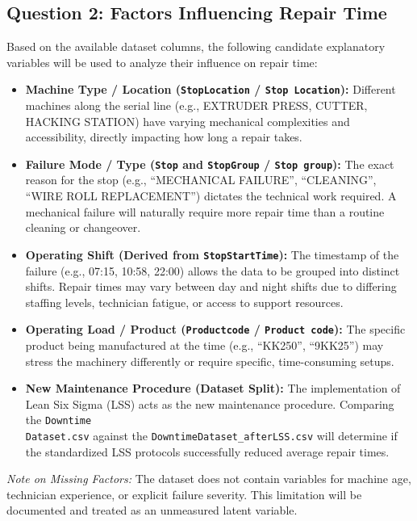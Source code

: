\subsection*{Question 2: Factors Influencing Repair Time}
Based on the available dataset columns, the following candidate explanatory variables will be used to analyze their influence on repair time:
\begin{itemize}
    \item \textbf{Machine Type / Location (\texttt{StopLocation} / \texttt{Stop Location}):} Different machines along the serial line (e.g., EXTRUDER PRESS, CUTTER, HACKING STATION) have varying mechanical complexities and accessibility, directly impacting how long a repair takes.
    \item \textbf{Failure Mode / Type (\texttt{Stop} and \texttt{StopGroup} / \texttt{Stop group}):} The exact reason for the stop (e.g., ``MECHANICAL FAILURE'', ``CLEANING'', ``WIRE ROLL REPLACEMENT'') dictates the technical work required. A mechanical failure will naturally require more repair time than a routine cleaning or changeover.
    \item \textbf{Operating Shift (Derived from \texttt{StopStartTime}):} The timestamp of the failure (e.g., 07:15, 10:58, 22:00) allows the data to be grouped into distinct shifts. Repair times may vary between day and night shifts due to differing staffing levels, technician fatigue, or access to support resources.
    \item \textbf{Operating Load / Product (\texttt{Productcode} / \texttt{Product code}):} The specific product being manufactured at the time (e.g., ``KK250'', ``9KK25'') may stress the machinery differently or require specific, time-consuming setups.
    \item \textbf{New Maintenance Procedure (Dataset Split):} The implementation of Lean Six Sigma (LSS) acts as the new maintenance procedure. Comparing the \texttt{Downtime\\Dataset.csv} against the \texttt{DowntimeDataset\_afterLSS.csv} will determine if the standardized LSS protocols successfully reduced average repair times.
\end{itemize}
\textit{Note on Missing Factors:} The dataset does not contain variables for machine age, technician experience, or explicit failure severity. This limitation will be documented and treated as an unmeasured latent variable.

